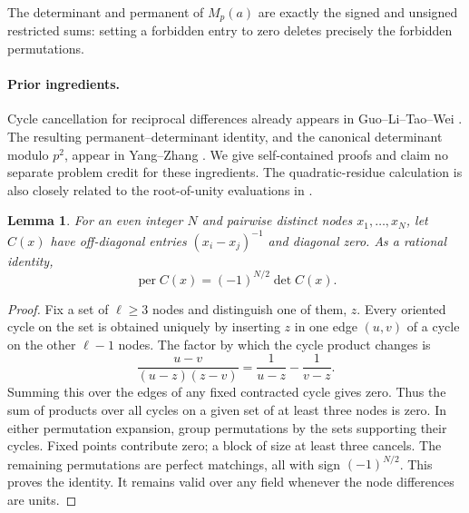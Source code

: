 \documentclass[11pt]{article}
\newtheorem{lemma}[theorem]{Lemma}
\DeclareMathOperator{\per}{per}
\begin{document}
The determinant and permanent of $M_p(a)$ are exactly the signed and
unsigned restricted sums: setting a forbidden entry to zero deletes
precisely the forbidden permutations.

\paragraph{Prior ingredients.}
Cycle cancellation for reciprocal differences already appears in
Guo--Li--Tao--Wei \cite[Lemma 3.1]{GLTW}. The resulting
permanent--determinant identity, and the canonical determinant modulo
$p^2$, appear in Yang--Zhang \cite[Proposition 12 and Lemma 15]{YZ}.
We give self-contained proofs and claim no separate problem credit for
these ingredients. The quadratic-residue calculation is also closely
related to the root-of-unity evaluations in \cite{GLTW}.

\begin{lemma}\label{cycles}
For an even integer $N$ and pairwise distinct nodes $x_1,\ldots,x_N$,
let $C(x)$ have off-diagonal entries $(x_i-x_j)^{-1}$ and diagonal zero.
As a rational identity,
\[
 \per C(x)=(-1)^{N/2}\det C(x).
\]
\end{lemma}
\begin{proof}
Fix a set of $\ell\geq3$ nodes and distinguish one of them, $z$.
Every oriented cycle on the set is obtained uniquely by inserting $z$
in one edge $(u,v)$ of a cycle on the other $\ell-1$ nodes. The factor
by which the cycle product changes is
\[
 \frac{u-v}{(u-z)(z-v)}
 =\frac1{u-z}-\frac1{v-z}.
\]
Summing this over the edges of any fixed contracted cycle gives zero.
Thus the sum of products over all cycles on a given set of at least
three nodes is zero. In either permutation expansion, group permutations
by the sets supporting their cycles. Fixed points contribute zero;
a block of size at least three cancels. The remaining permutations
are perfect matchings, all with sign $(-1)^{N/2}$. This proves the identity.
It remains valid over any field whenever the node differences are units.
\end{proof}
\end{document}
